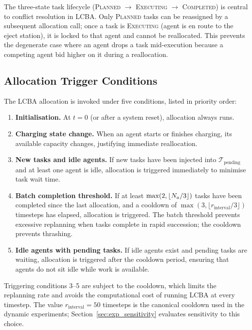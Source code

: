 The three-state task lifecycle (\textsc{Planned} $\to$ \textsc{Executing}
$\to$ \textsc{Completed}) is central to conflict resolution in LCBA.
Only \textsc{Planned} tasks can be reassigned by a subsequent allocation call;
once a task is \textsc{Executing} (agent is en route to the eject station),
it is locked to that agent and cannot be reallocated.
This prevents the degenerate case where an agent drops a task mid-execution
because a competing agent bid higher on it during a reallocation.


\subsection{Allocation Trigger Conditions}
\label{sec:method_triggers}

The LCBA allocation is invoked under five conditions, listed in priority order:

\begin{enumerate}
  \item \textbf{Initialisation.} At $t = 0$ (or after a system reset),
        allocation always runs.
  \item \textbf{Charging state change.} When an agent starts or finishes
        charging, its available capacity changes, justifying immediate
        reallocation.
  \item \textbf{New tasks and idle agents.} If new tasks have been injected
        into $\mathcal{T}_{\text{pending}}$ and at least one agent is idle,
        allocation is triggered immediately to minimise task wait time.
  \item \textbf{Batch completion threshold.} If at least
        $\max(2, \lfloor N_a/3 \rfloor)$ tasks have been completed since
        the last allocation, and a cooldown of
        $\max(3, \lfloor r_{\text{interval}}/3 \rfloor)$ timesteps has
        elapsed, allocation is triggered.
        The batch threshold prevents excessive replanning when tasks complete
        in rapid succession; the cooldown prevents thrashing.
  \item \textbf{Idle agents with pending tasks.}
        If idle agents exist and pending tasks are waiting, allocation is
        triggered after the cooldown period, ensuring that agents do not sit
        idle while work is available.
\end{enumerate}

Triggering conditions 3--5 are subject to the cooldown, which limits the
replanning rate and avoids the computational cost of running LCBA at every
timestep.
The value $r_{\text{interval}} = 50$ timesteps is the canonical cooldown used
in the dynamic experiments; Section~\ref{sec:exp_sensitivity} evaluates
sensitivity to this choice.


